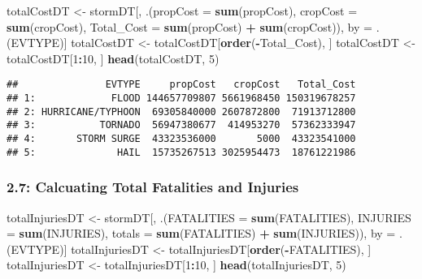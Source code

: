\documentclass[]{article}
\newenvironment{Shaded}{\begin{snugshade}}{\end{snugshade}}
\newcommand{\KeywordTok}[1]{\textcolor[rgb]{0.13,0.29,0.53}{\textbf{#1}}}
\newcommand{\DataTypeTok}[1]{\textcolor[rgb]{0.13,0.29,0.53}{#1}}
\newcommand{\DecValTok}[1]{\textcolor[rgb]{0.00,0.00,0.81}{#1}}
\newcommand{\StringTok}[1]{\textcolor[rgb]{0.31,0.60,0.02}{#1}}
\newcommand{\OperatorTok}[1]{\textcolor[rgb]{0.81,0.36,0.00}{\textbf{#1}}}
\newcommand{\NormalTok}[1]{#1}
\begin{document}
\begin{Shaded}
\begin{Highlighting}[]
\NormalTok{totalCostDT <-}\StringTok{ }\NormalTok{stormDT[, .(}\DataTypeTok{propCost =} \KeywordTok{sum}\NormalTok{(propCost), }\DataTypeTok{cropCost =} \KeywordTok{sum}\NormalTok{(cropCost), }\DataTypeTok{Total_Cost =} \KeywordTok{sum}\NormalTok{(propCost) }\OperatorTok{+}\StringTok{ }\KeywordTok{sum}\NormalTok{(cropCost)), by =}\StringTok{ }\NormalTok{.(EVTYPE)]}
\NormalTok{totalCostDT <-}\StringTok{ }\NormalTok{totalCostDT[}\KeywordTok{order}\NormalTok{(}\OperatorTok{-}\NormalTok{Total_Cost), ]}
\NormalTok{totalCostDT <-}\StringTok{ }\NormalTok{totalCostDT[}\DecValTok{1}\OperatorTok{:}\DecValTok{10}\NormalTok{, ]}
\KeywordTok{head}\NormalTok{(totalCostDT, }\DecValTok{5}\NormalTok{)}
\end{Highlighting}
\end{Shaded}

\begin{verbatim}
##               EVTYPE     propCost   cropCost   Total_Cost
## 1:             FLOOD 144657709807 5661968450 150319678257
## 2: HURRICANE/TYPHOON  69305840000 2607872800  71913712800
## 3:           TORNADO  56947380677  414953270  57362333947
## 4:       STORM SURGE  43323536000       5000  43323541000
## 5:              HAIL  15735267513 3025954473  18761221986
\end{verbatim}

\subsubsection{2.7: Calcuating Total Fatalities and
Injuries}\label{calcuating-total-fatalities-and-injuries}

\begin{Shaded}
\begin{Highlighting}[]
\NormalTok{totalInjuriesDT <-}\StringTok{ }\NormalTok{stormDT[, .(}\DataTypeTok{FATALITIES =} \KeywordTok{sum}\NormalTok{(FATALITIES), }\DataTypeTok{INJURIES =} \KeywordTok{sum}\NormalTok{(INJURIES), }\DataTypeTok{totals =} \KeywordTok{sum}\NormalTok{(FATALITIES) }\OperatorTok{+}\StringTok{ }\KeywordTok{sum}\NormalTok{(INJURIES)), by =}\StringTok{ }\NormalTok{.(EVTYPE)]}
\NormalTok{totalInjuriesDT <-}\StringTok{ }\NormalTok{totalInjuriesDT[}\KeywordTok{order}\NormalTok{(}\OperatorTok{-}\NormalTok{FATALITIES), ]}
\NormalTok{totalInjuriesDT <-}\StringTok{ }\NormalTok{totalInjuriesDT[}\DecValTok{1}\OperatorTok{:}\DecValTok{10}\NormalTok{, ]}
\KeywordTok{head}\NormalTok{(totalInjuriesDT, }\DecValTok{5}\NormalTok{)}
\end{Highlighting}
\end{Shaded}
\end{document}
